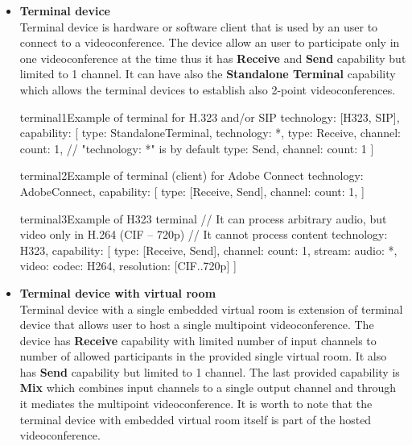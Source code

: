 \documentclass[a4paper]{report}
\begin{document}
\begin{itemize}

\item \textbf{Terminal device} \\
  Terminal device is hardware or software client that is used by an user to 
  connect to a videoconference. The device allow an user to participate only in
  one videoconference at the time thus it has \textbf{Receive} and 
  \textbf{Send} capability but limited to 1 channel. It can have also the 
  \textbf{Standalone Terminal} capability which allows the terminal devices to  
  establish also 2-point videoconferences. 
  
\begin{TopologyExample}{terminal1}{Example of terminal for H.323 and/or SIP}
technology: [H323, SIP],
capability: [
  {type: StandaloneTerminal, technology: *},
  {type: Receive, channel: {count: 1}}, // "technology: *" is by default
  {type: Send, channel: {count: 1}}
]
\end{TopologyExample}

\begin{TopologyExample}{terminal2}{Example of terminal (client) for Adobe Connect}
technology: AdobeConnect,
capability: [
  {type: [Receive, Send], channel: {count: 1}},
]
\end{TopologyExample}

\begin{TopologyExample}{terminal3}{Example of H323 terminal}
// It can process arbitrary audio, but video only in H.264 (CIF -- 720p)
// It cannot process content
technology: H323,
capability: [
  {type: [Receive, Send], channel: {
    count: 1, 
    stream: {
      audio: *,
      video: {codec: H264, resolution: [CIF..720p]}
    }  
  }}
]
\end{TopologyExample}

\item \textbf{Terminal device with virtual room} \\
  Terminal device with a single embedded virtual room is extension of terminal 
  device that allows user to host a single multipoint videoconference. The 
  device has \textbf{Receive} capability with limited number of input channels 
  to number of allowed participants in the provided single virtual room. It also 
  has \textbf{Send} capability but limited to 1 channel. The last provided 
  capability is \textbf{Mix} which combines input channels to a single output 
  channel and through it mediates the multipoint videoconference. It is worth 
  to note that the terminal device with embedded virtual room itself is part of 
  the hosted videoconference.
  

\end{itemize}
\end{document}
